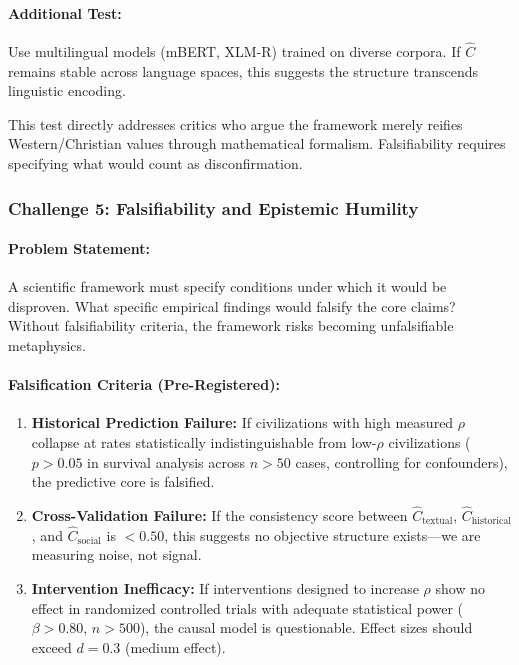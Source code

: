 \documentclass[11pt,a4paper]{article}
\theoremstyle{definition}
\theoremstyle{remark}
\begin{document}
\begin{small}
\paragraph{Additional Test:} 
Use multilingual models (mBERT, XLM-R) trained on diverse corpora. If \(\hat{C}\) remains stable across language spaces, this suggests the structure transcends linguistic encoding.

This test directly addresses critics who argue the framework merely reifies Western/Christian values through mathematical formalism. Falsifiability requires specifying what would count as disconfirmation.

\subsubsection{Challenge 5: Falsifiability and Epistemic Humility}

\paragraph{Problem Statement:} 
A scientific framework must specify conditions under which it would be disproven. What specific empirical findings would falsify the core claims? Without falsifiability criteria, the framework risks becoming unfalsifiable metaphysics.

\paragraph{Falsification Criteria (Pre-Registered):}

\begin{enumerate}
    \item \textbf{Historical Prediction Failure:} If civilizations with high measured \(\rho\) collapse at rates statistically indistinguishable from low-\(\rho\) civilizations (\(p > 0.05\) in survival analysis across \(n > 50\) cases, controlling for confounders), the predictive core is falsified.
    
    \item \textbf{Cross-Validation Failure:} If the consistency score between \(\hat{C}_{\text{textual}}\), \(\hat{C}_{\text{historical}}\), and \(\hat{C}_{\text{social}}\) is \(< 0.50\), this suggests no objective structure exists—we are measuring noise, not signal.
    
    \item \textbf{Intervention Inefficacy:} If interventions designed to increase \(\rho\) show no effect in randomized controlled trials with adequate statistical power (\(\beta > 0.80\), \(n > 500\)), the causal model is questionable. Effect sizes should exceed \(d = 0.3\) (medium effect).
    

\end{enumerate}
\end{small}
\end{document}
